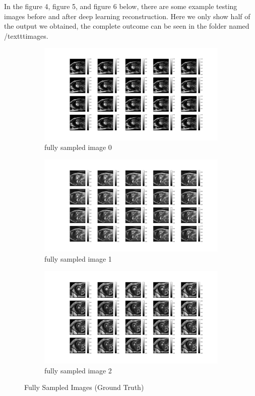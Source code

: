 \documentclass{article}
\begin{document}
In the figure 4, figure 5, and figure 6 below, there are some example testing images before and after deep
learning reconstruction. Here we only show half of the output we obtained, the complete outcome
can be seen in the folder named /texttt{images}.
\begin{figure}[ht]
  \centering
  \begin{subfigure}[b]{0.8\linewidth}
    \includegraphics[width=\linewidth]{../images/output/full_sampling/full_sampling_0.png}
    \caption{fully sampled image 0}
  \end{subfigure}
  \quad
  \begin{subfigure}[b]{0.8\linewidth}
    \includegraphics[width=\linewidth]{../images/output/full_sampling/full_sampling_1.png}
    \caption{fully sampled image 1}
  \end{subfigure}
  \quad
  \begin{subfigure}[b]{0.8\linewidth}
    \includegraphics[width=\linewidth]{../images/output/full_sampling/full_sampling_2.png}
    \caption{fully sampled image 2}
  \end{subfigure}
  \caption{Fully Sampled Images (Ground Truth)}
\end{figure}
\end{document}
